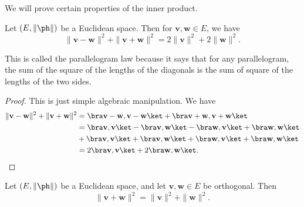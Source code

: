 \documentclass[a4paper]{article}
\begin{document}
We will prove certain properties of the inner product.
\begin{prop}
  Let $(E, \|\ph\|)$ be a Euclidean space. Then for $\mathbf{v}, \mathbf{w} \in E$, we have
  \[
    \|\mathbf{v} - \mathbf{w}\|^2 + \|\mathbf{v} + \mathbf{w}\|^2 = 2\|\mathbf{v}\|^2 + 2\|\mathbf{w}\|^2.
  \]
\end{prop}
This is called the parallelogram law because it says that for any parallelogram, the sum of the square of the lengths of the diagonals is the sum of square of the lengths of the two sides.
\begin{center}
\end{center}

\begin{proof}
  This is just simple algebraic manipulation. We have
  \begin{align*}
    \|\mathbf{v} - \mathbf{w}\|^2 + \|\mathbf{v} + \mathbf{w}\|^2 &= \bra \mathbf{v} - \mathbf{w}, \mathbf{v} - \mathbf{w}\ket + \bra \mathbf{v} + \mathbf{w}, \mathbf{v} + \mathbf{w}\ket\\
    &= \bra \mathbf{v}, \mathbf{v}\ket - \bra \mathbf{v}, \mathbf{w}\ket - \bra \mathbf{w}, \mathbf{v}\ket + \bra \mathbf{w}, \mathbf{w}\ket\\
    &+ \bra \mathbf{v}, \mathbf{v}\ket + \bra \mathbf{v}, \mathbf{w}\ket + \bra \mathbf{w}, \mathbf{v}\ket + \bra \mathbf{w}, \mathbf{w}\ket\\
    &= 2\bra \mathbf{v}, \mathbf{v}\ket + 2 \bra \mathbf{w}, \mathbf{w}\ket.
  \end{align*}
\end{proof}

\begin{prop}
  Let $(E, \|\ph\|)$ be a Euclidean space, and let $\mathbf{v}, \mathbf{w}\in E$ be orthogonal. Then
  \[
    \|\mathbf{v} + \mathbf{w}\|^2 = \|\mathbf{v}\|^2 + \|\mathbf{w}\|^2.
  \]
\end{prop}
\end{document}

